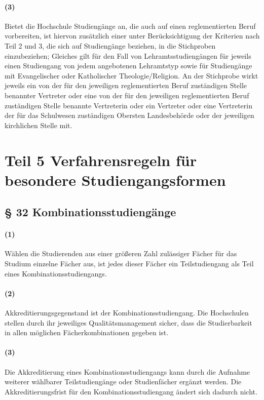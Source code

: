 \documentclass[a4paper]{scrartcl}
\begin{document}
\paragraph{(3)} Bietet die Hochschule Studiengänge an, die auch auf einen reglementierten Beruf vorbereiten, ist hiervon zusätzlich einer unter Berücksichtigung der Kriterien nach Teil 2 und 3, die sich auf Studiengänge beziehen, in die Stichproben einzubeziehen; Gleiches gilt für den Fall von Lehramtsstudiengängen für jeweils einen Studiengang von jedem angebotenen Lehramtstyp sowie für Studiengänge mit Evangelischer oder Katholischer Theologie/Religion. An der Stichprobe wirkt jeweils ein von der für den jeweiligen reglementierten Beruf zuständigen Stelle benannter Vertreter oder eine von der für den jeweiligen reglementierten Beruf zuständigen Stelle benannte Vertreterin oder ein Vertreter oder eine Vertreterin der für das Schulwesen zuständigen Obersten Landesbehörde oder der jeweiligen kirchlichen Stelle mit.
\section{Teil 5 Verfahrensregeln für besondere Studiengangsformen}
\subsection{§ 32 Kombinationsstudiengänge}
\paragraph{(1)}  Wählen die Studierenden aus einer größeren Zahl zulässiger Fächer für das Studium einzelne Fächer aus, ist jedes dieser Fächer ein Teilstudiengang als Teil eines Kombinationsstudiengangs.
\paragraph{(2)} Akkreditierungsgegenstand ist der Kombinationsstudiengang. Die Hochschulen stellen durch ihr jeweiliges Qualitätsmanagement sicher, dass die Studierbarkeit in allen möglichen Fächerkombinationen gegeben ist.
\paragraph{(3)} Die Akkreditierung eines Kombinationsstudiengangs kann durch die Aufnahme weiterer wählbarer Teilstudiengänge oder Studienfächer ergänzt werden. Die  Akkreditierungsfrist für den Kombinationsstudiengang ändert sich dadurch nicht.\\
\end{document}
